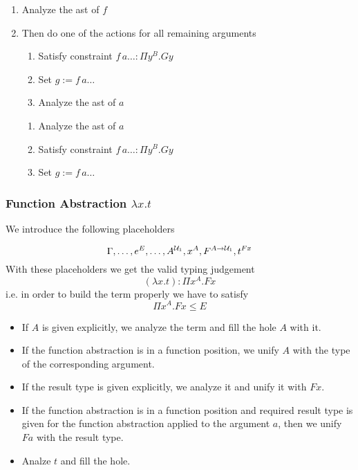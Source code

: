\begin{enumerate}

\item Analyze the ast of $f$

\item Then do one of the actions for all remaining arguments

    \begin{enumerate}
    \item Satisfy constraint $f \, a \ldots: \Pi y^B. G y$
    \item Set $g := f \, a \ldots$
    \item Analyze the ast of $a$
    \end{enumerate}

    \begin{enumerate}
    \item Analyze the ast of $a$
    \item Satisfy constraint $f \, a \ldots: \Pi y^B. G y$
    \item Set $g := f \, a \ldots$
    \end{enumerate}

\end{enumerate}







\subsubsection{Function Abstraction $\lambda x. t$}



We introduce the following placeholders

$$
\Gamma, \ldots, e^E, \ldots, A^{{\cal{U}}_1}, x^A, F^{A\to{\cal{U}}_1},  t^{F x}
$$
%
With these placeholders we get the valid typing judgement
$$
(\lambda x. t) : \Pi x^A. F x
$$
i.e. in order to build the term properly we have to satisfy
$$
\Pi x^A. F x \le E
$$


\begin{itemize}

\item
    If $A$ is given explicitly, we analyze the term and fill the hole $A$ with it.

\item
    If the function abstraction is in a function position, we unify $A$ with the
    type of the corresponding argument.

\item
    If the result type is given explicitly, we analyze it and unify it with $F
    x$.

\item
    If the function abstraction is in a function position and required result
    type is given for the function abstraction applied to the argument $a$, then
    we unify $F a$ with the result type.

\item
    Analze $t$ and fill the hole.
\end{itemize}






